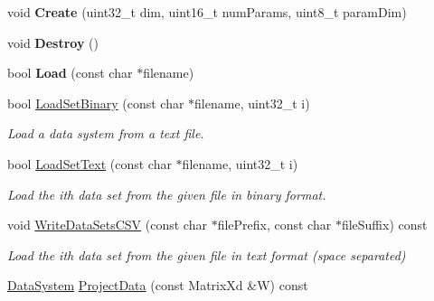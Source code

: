 \begin{DoxyCompactItemize}
\item 
\hypertarget{struct_d_r_d_s_p_1_1_data_system_a22dbffce42551aa598d9b5b763253e21}{void {\bfseries Create} (uint32\-\_\-t dim, uint16\-\_\-t num\-Params, uint8\-\_\-t param\-Dim)}\label{struct_d_r_d_s_p_1_1_data_system_a22dbffce42551aa598d9b5b763253e21}

\item 
\hypertarget{struct_d_r_d_s_p_1_1_data_system_a584d7c384388bc0fd6cda08aa50fc1cd}{void {\bfseries Destroy} ()}\label{struct_d_r_d_s_p_1_1_data_system_a584d7c384388bc0fd6cda08aa50fc1cd}

\item 
\hypertarget{struct_d_r_d_s_p_1_1_data_system_a1eda80428b462bb9870b17a151aa36b6}{bool {\bfseries Load} (const char $\ast$filename)}\label{struct_d_r_d_s_p_1_1_data_system_a1eda80428b462bb9870b17a151aa36b6}

\item 
\hypertarget{struct_d_r_d_s_p_1_1_data_system_a1199512ac121edb15215c5031a5ac531}{bool \hyperlink{struct_d_r_d_s_p_1_1_data_system_a1199512ac121edb15215c5031a5ac531}{Load\-Set\-Binary} (const char $\ast$filename, uint32\-\_\-t i)}\label{struct_d_r_d_s_p_1_1_data_system_a1199512ac121edb15215c5031a5ac531}

\begin{DoxyCompactList}\small\item\em Load a data system from a text file. \end{DoxyCompactList}\item 
\hypertarget{struct_d_r_d_s_p_1_1_data_system_ae1487971b82db1d86736eddd2c520355}{bool \hyperlink{struct_d_r_d_s_p_1_1_data_system_ae1487971b82db1d86736eddd2c520355}{Load\-Set\-Text} (const char $\ast$filename, uint32\-\_\-t i)}\label{struct_d_r_d_s_p_1_1_data_system_ae1487971b82db1d86736eddd2c520355}

\begin{DoxyCompactList}\small\item\em Load the ith data set from the given file in binary format. \end{DoxyCompactList}\item 
\hypertarget{struct_d_r_d_s_p_1_1_data_system_a6b4e0e6bc3ba1135a08fc2c2ed874e39}{void \hyperlink{struct_d_r_d_s_p_1_1_data_system_a6b4e0e6bc3ba1135a08fc2c2ed874e39}{Write\-Data\-Sets\-C\-S\-V} (const char $\ast$file\-Prefix, const char $\ast$file\-Suffix) const }\label{struct_d_r_d_s_p_1_1_data_system_a6b4e0e6bc3ba1135a08fc2c2ed874e39}

\begin{DoxyCompactList}\small\item\em Load the ith data set from the given file in text format (space separated) \end{DoxyCompactList}\item 
\hypertarget{struct_d_r_d_s_p_1_1_data_system_afd5e714d21c0d7c1b1efb65b233788ab}{\hyperlink{struct_d_r_d_s_p_1_1_data_system}{Data\-System} \hyperlink{struct_d_r_d_s_p_1_1_data_system_afd5e714d21c0d7c1b1efb65b233788ab}{Project\-Data} (const Matrix\-Xd \&W) const }\label{struct_d_r_d_s_p_1_1_data_system_afd5e714d21c0d7c1b1efb65b233788ab}


\end{DoxyCompactItemize}
